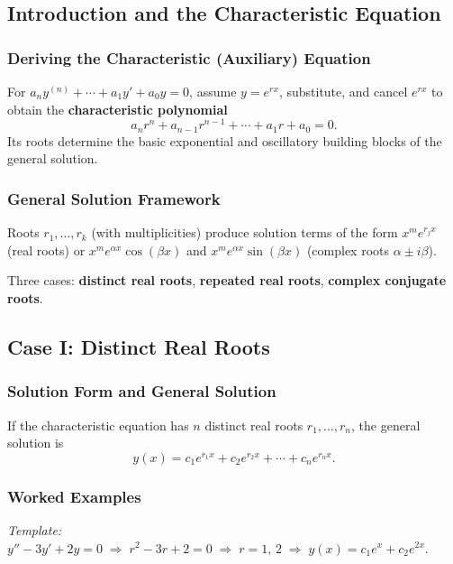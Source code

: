 \documentclass[10pt]{article}
\newcommand{\m}[1]{$#1$}
\begin{document}
\subsection{Introduction and the Characteristic Equation}

    \subsubsection{Deriving the Characteristic (Auxiliary) Equation}
    For \m{a_n y^{(n)} + \cdots + a_1 y' + a_0 y = 0}, assume \m{y = e^{rx}}, substitute, and cancel
    \m{e^{rx}} to obtain the \textbf{characteristic polynomial}
    \[
        a_n r^n + a_{n-1} r^{n-1} + \cdots + a_1 r + a_0 = 0.
    \]
    Its roots determine the basic exponential and oscillatory building blocks of the general solution.

    \subsubsection{General Solution Framework}
    Roots \m{r_1, \ldots, r_k} (with multiplicities) produce solution terms of the form
    \m{x^m e^{r_j x}} (real roots) or \m{x^m e^{\alpha x}\cos(\beta x)} and
    \m{x^m e^{\alpha x}\sin(\beta x)} (complex roots \m{\alpha \pm i\beta}).

    Three cases: \textbf{distinct real roots}, \textbf{repeated real roots},
    \textbf{complex conjugate roots}.

\subsection{Case I: Distinct Real Roots}

    \subsubsection{Solution Form and General Solution}
    If the characteristic equation has \m{n} distinct real roots \m{r_1, \ldots, r_n}, the general
    solution is
    \[
        y(x) = c_1 e^{r_1 x} + c_2 e^{r_2 x} + \cdots + c_n e^{r_n x}.
    \]

    \subsubsection{Worked Examples}

    \textit{Template:} \quad
    \m{y'' - 3y' + 2y = 0 \;\Rightarrow\; r^2 - 3r + 2 = 0 \;\Rightarrow\; r = 1,\,2
    \;\Rightarrow\; y(x) = c_1 e^{x} + c_2 e^{2x}.}
\end{document}
